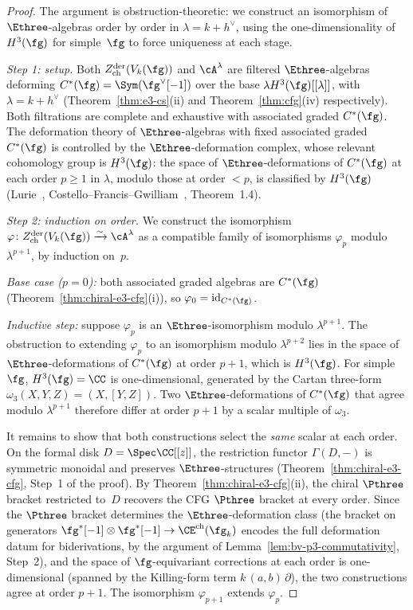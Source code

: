 \begin{proof}
The argument is obstruction-theoretic: we construct an
isomorphism of $\Ethree$-algebras order by order in
$\lambda = k + h^\vee$, using the one-dimensionality of
$H^3(\fg)$ for simple~$\fg$ to force uniqueness at each
stage.

\smallskip
\noindent\textit{Step 1: setup.}
Both $Z^{\mathrm{der}}_{\mathrm{ch}}(V_k(\fg))$ and
$\cA^\lambda$ are filtered $\Ethree$-algebras deforming
$C^*(\fg) = \Sym(\fg^\vee[-1])$ over the base
$\lambda H^3(\fg)[[\lambda]]$, with $\lambda = k + h^\vee$
(Theorem~\ref{thm:e3-cs}(ii) and
Theorem~\ref{thm:cfg}(iv) respectively).
Both filtrations are complete and exhaustive with
associated graded $C^*(\fg)$.
The deformation theory of $\Ethree$-algebras with fixed
associated graded $C^*(\fg)$ is controlled by the
$\Ethree$-deformation complex, whose relevant cohomology
group is $H^3(\fg)$: the space of $\Ethree$-deformations
of $C^*(\fg)$ at each order $p \geq 1$ in $\lambda$,
modulo those at order $< p$, is classified by
$H^3(\fg)$ (Lurie~\cite{HA},
Costello--Francis--Gwilliam~\cite{CFG26},
Theorem~1.4).

\smallskip
\noindent\textit{Step 2: induction on order.}
We construct the isomorphism
$\varphi \colon Z^{\mathrm{der}}_{\mathrm{ch}}(V_k(\fg))
\xrightarrow{\sim} \cA^\lambda$ as a compatible family of
isomorphisms $\varphi_p$ modulo $\lambda^{p+1}$, by
induction on~$p$.

\emph{Base case ($p = 0$):} both associated graded
algebras are $C^*(\fg)$
(Theorem~\ref{thm:chiral-e3-cfg}(i)), so
$\varphi_0 = \mathrm{id}_{C^*(\fg)}$.

\emph{Inductive step:} suppose $\varphi_p$ is an
$\Ethree$-isomorphism modulo $\lambda^{p+1}$.
The obstruction to extending $\varphi_p$ to an
isomorphism modulo $\lambda^{p+2}$ lies in the
space of $\Ethree$-deformations of $C^*(\fg)$ at
order $p+1$, which is $H^3(\fg)$. For simple~$\fg$,
$H^3(\fg) = \CC$ is one-dimensional, generated by the
Cartan three-form
$\omega_3(X, Y, Z) = (X, [Y, Z])$.
Two $\Ethree$-deformations of $C^*(\fg)$
that agree modulo $\lambda^{p+1}$ therefore differ at order
$p+1$ by a scalar multiple of $\omega_3$.

It remains to show that both constructions select the
\emph{same} scalar at each order. On the formal disk
$D = \Spec \CC[[z]]$, the restriction functor
$\Gamma(D, -)$ is symmetric monoidal and preserves
$\Ethree$-structures
(Theorem~\ref{thm:chiral-e3-cfg}, Step~1 of the
proof). By Theorem~\ref{thm:chiral-e3-cfg}(ii), the
chiral $\Pthree$ bracket restricted to~$D$ recovers
the CFG $\Pthree$ bracket at every order. Since the
$\Pthree$ bracket determines the $\Ethree$-deformation
class (the bracket on generators
$\fg^*[-1] \otimes \fg^*[-1] \to \CE^{\mathrm{ch}}(\fg_k)$
encodes the full deformation datum for biderivations, by
the argument of
Lemma~\ref{lem:bv-p3-commutativity}, Step~2), and the
space of $\fg$-equivariant corrections at each order is
one-dimensional (spanned by the Killing-form term
$k\,(a,b)\,\partial$), the two constructions agree at
order $p+1$. The isomorphism $\varphi_{p+1}$ extends
$\varphi_p$.


\end{proof}
